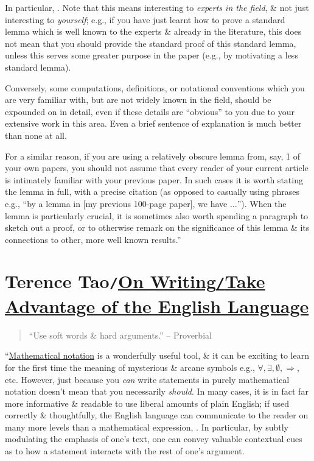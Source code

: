 \documentclass[oneside]{book}
\numberwithin{equation}{section}
\begin{document}
In particular, . Note that this means interesting to \textit{experts in the field}, \& not just interesting to \textit{yourself}; e.g., if you have just learnt how to prove a standard lemma which is well known to the experts \& already in the literature, this does not mean that you should provide the standard proof of this standard lemma, unless this serves some greater purpose in the paper (e.g., by motivating a less standard lemma).

Conversely, some computations, definitions, or notational conventions which you are very familiar with, but are not widely known in the field, should be expounded on in detail, even if these details are ``obvious'' to you due to your extensive work in this area. Even a brief sentence of explanation is much better than none at all.

For a similar reason, if you are using a relatively obscure lemma from, say, 1 of your own papers, you should not assume that every reader of your current article is intimately familiar with your previous paper. In such cases it is worth stating the lemma in full, with a precise citation (as opposed to casually using phrases e.g., ``by a lemma in [my previous 100-page paper], we have $\ldots$''). When the lemma is particularly crucial, it is sometimes also worth spending a paragraph to sketch out a proof, or to otherwise remark on the significance of this lemma \& its connections to other, more well known results.''

\section{Terence Tao\texttt{/}\href{https://terrytao.wordpress.com/advice-on-writing-papers/take-advantage-of-the-english-language/}{On Writing\texttt{/}Take Advantage of the English Language}}
\begin{quotation}
	``Use soft words \& hard arguments.'' -- Proverbial
\end{quotation}
``\href{https://terrytao.wordpress.com/advice-on-writing-papers/use-good-notation/}{Mathematical notation} is a wonderfully useful tool, \& it can be exciting to learn for the first time the meaning of mysterious \& arcane symbols e.g., $\forall,\exists,\emptyset,\Rightarrow$, etc. However, just because you \textit{can} write statements in purely mathematical notation doesn't mean that you necessarily \textit{should}. In many cases, it is in fact far more informative \& readable to use liberal amounts of plain English; if used correctly \& thoughtfully, the English language can communicate to the reader on many more levels than a mathematical expression, . In particular, by subtly modulating the emphasis of one's text, one can convey valuable contextual cues as to how a statement interacts with the rest of one's argument.
\end{document}
